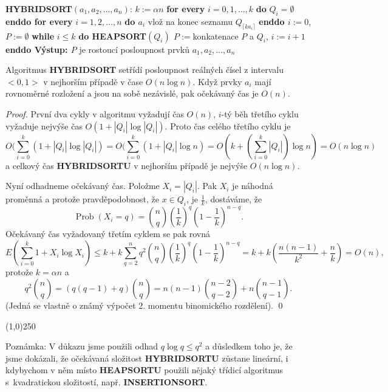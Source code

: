 \documentclass[a4paper,12pt]{article}
\newenvironment{myproof}{
  \begin{proof}
    
  }{
  \end{proof}
  \begin{center}
   \line(1,0){250}
   \end{center}
  }
\DeclareMathOperator*{\Prob}{Prob}
\begin{document}
{\bf HYBRIDSORT$(a_1,a_2,\dots,a_n)$}:\newline 
$k:=\alpha n$\newline 
{\bf \textsf{for every}} $i=0,1,\dots,k$ {\bf do} $Q_i=\emptyset$ {\bf enddo\newline 
\textsf{for every}} $i=1,2,\dots,n$ {\bf do\newline 
\phantom{{\rm ---}}$a_i$} vlož na konec seznamu $Q_{\lceil ka_
i\rceil}$\newline 
{\bf enddo\newline 
$i:=0$}, $P:=\emptyset$\newline 
{\bf while} $i\le k$ {\bf do\newline 
\phantom{{\rm ---}}HEAPSORT$(Q_i)$
$P:=$}konkatenace $P$ a $Q_i$, $i:=i+1$\newline 
{\bf enddo\newline 
Výstup: $P$} je rostoucí posloupnost prvků 
$a_1,a_2,\dots,a_n$

\begin{veta}Algoritmus {\bf HYBRIDSORT} setřídí 
posloupnost reál\-ných čísel z intervalu $<0,1>$ v 
nejhorším případě v čase $O(n\log n)$. Když prvky $
a_i$ 
mají rovnoměrné rozložení a jsou na sobě nezá\-vislé, 
pak očekávaný čas je $O(n)$.
\end{veta}

\begin{myproof}První dva cykly v algoritmu 
vyžadují čas $O(n)$, $i$-tý běh třetího cyklu vyžaduje 
nejvýše čas $O(1+|Q_i|\log|Q_i|)$. Proto čas celého třetího cyklu je 
$$O(\sum_{i=0}^k(1+|Q_i|\log|Q_i|)=O(\sum_{i=0}^k(1+|Q_i|\log n)=
O(k+(\sum_{i=0}^k|Q_i|)\log n)=O(n\log n)$$
a celkový čas {\bf HYBRIDSORTU} v nejhorším případě je nejvýše $
O(n\log n)$.

Nyní odhadneme očekávaný čas. Položme 
$X_i=|Q_i|$. Pak 
$X_i$ je ná\-hodná proměnná a 
protože pravděpodobnost, že $x\in Q_i$, je $\frac 1k$, dostá\-váme, že 
$$\Prob(X_i=q)=\binom nq(\frac 1k)^q(1-\frac 1k)^{n-q}.$$
Očekávaný čas vyžadovaný třetím cyklem se pak rovná 
$$E(\sum_{i=0}^k1+X_i\log X_i)\le k+k\sum_{q=2}^nq^2\binom nq(\frac 
1k)^q(1-\frac 1k)^{n-q}=k+k(\frac {n(n-1)}{k^2}+\frac nk)=O(n),$$
protože $k=\alpha n$ a 
$$q^2\binom nq=(q(q-1)+q)\binom nq=n(n-1)\binom {n-2}{q-2}+n\binom {
n-1}{q-1}.$$
(Jedná se vlastně o známý výpočet 2. momentu 
binomického rozdělení). \qed
\end{myproof}

Poznámka: V důkazu jsme použili odhad 
$q\log q\le q^2$ a důsledkem toho je, že jsme 
dokázali, že očekávaná složitost {\bf HYBRIDSORTU }
zůstane lineární, i kdybychom v něm místo 
{\bf HEAPSORTU} použili nějaký třídicí algoritmus s~kvadratickou složitostí, např. {\bf INSERTIONSORT}.
\end{document}

